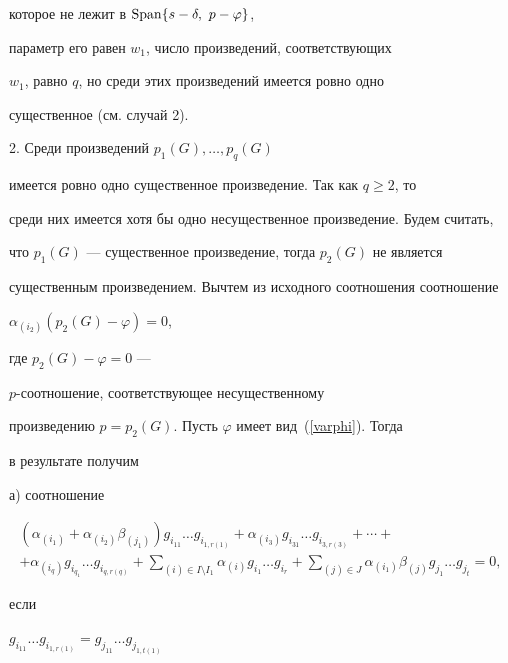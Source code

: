 \begin{pf}
которое не лежит в $\Span\lbrace s-\delta,\ p-\varphi\rbrace$,


параметр его равен $w_{1}$, число произведений, соответствующих


$w_{1}$, равно $q$, но среди этих произведений имеется ровно одно


существенное (см. случай 2).





2. Среди произведений $p_{1}(G),\dotsc,p_{q}(G)$


имеется ровно одно существенное произведение. Так как $q\geq 2$, то


среди них имеется хотя бы одно несущественное произведение. Будем считать,


что $p_{1}(G)$ --- существенное произведение, тогда $p_{2}(G)$ не является


существенным произведением. Вычтем из исходного соотношения соотношение


$\alpha_{(i_{2})}(p_{2}(G)-\varphi)=0$,


где $p_{2}(G)-\varphi=0$ --- \linebreak


$p$-соотношение, соответствующее несущественному


произведению $p=p_{2}(G)$. Пусть $\varphi$ имеет вид~(\ref{varphi}). Тогда


в результате получим





а) соотношение 


\begin{multline*}


(\alpha_{(i_{1})}+\alpha_{(i_{2})}\beta_{(j_{1})})


g_{i_{11}}\dotsc g_{i_{1,r(1)}}+


\alpha_{(i_{3})}g_{i_{31}}\dotsc g_{i_{3,r(3)}}+\dotsb+ \\


%


+\alpha_{(i_{q})}g_{i_{q_{1}}}\dotsc g_{i_{q,r(q)}}+


\sum_{(i)\in I\setminus I_{1}}\alpha_{(i)}g_{i_{1}}\dotsc g_{i_{r}}+


\sum_{(j)\in J}\alpha_{(i_{1})}\beta_{(j)}g_{j_{1}}\dotsc g_{j_{t}}=0,


\end{multline*}


если


$g_{i_{11}}\dotsc g_{i_{1,r(1)}}=g_{j_{11}}\dotsc g_{j_{1,t(1)}}$ 



\end{pf}
